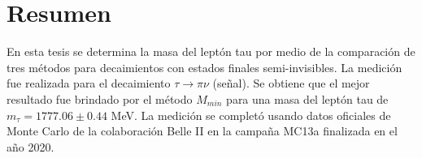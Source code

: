 
\newpage


\chapter{Resumen}

En esta tesis se determina la masa del leptón tau por medio de la comparación de tres métodos para decaimientos con estados finales semi-invisibles.
La medición fue realizada para el decaimiento \(\tau\rightarrow\pi\nu\) (señal). Se obtiene que el mejor resultado fue brindado por el método \(M_{min}\) para una masa del leptón tau de \(m_{\tau}=1777.06\pm0.44\) MeV. La medición se completó usando datos oficiales de Monte Carlo de la colaboración Belle II en la campaña MC13a finalizada en el año 2020.

  
